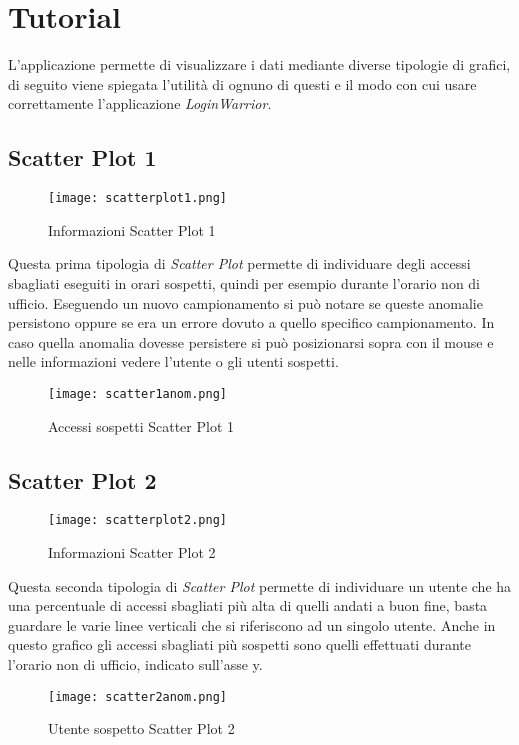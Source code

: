 \chapter{Tutorial}
L'applicazione permette di visualizzare i dati mediante diverse tipologie di grafici, di seguito viene spiegata l'utilità di ognuno di questi e il modo con cui usare correttamente l'applicazione \textit{LoginWarrior}.

\section{Scatter Plot 1}
\begin{figure}[H]
	\centering
	\texttt{[image: scatterplot1.png]}
	\caption{Informazioni Scatter Plot 1}
  \end{figure}
Questa prima tipologia di \textit{Scatter Plot} permette di individuare degli accessi sbagliati eseguiti in orari sospetti, quindi per esempio durante l'orario non di ufficio. Eseguendo un nuovo campionamento si può notare se queste anomalie persistono oppure se era un errore dovuto a quello specifico campionamento. In caso quella anomalia dovesse persistere si può posizionarsi sopra con il mouse e nelle informazioni vedere l'utente o gli utenti sospetti.
\begin{figure}[H]
	\centering
	\texttt{[image: scatter1anom.png]}
	\caption{Accessi sospetti Scatter Plot 1}
\end{figure}

\section{Scatter Plot 2}
\begin{figure}[H]
	\centering
	\texttt{[image: scatterplot2.png]}
	\caption{Informazioni Scatter Plot 2}
  \end{figure}
Questa seconda tipologia di \textit{Scatter Plot} permette di individuare un utente che ha una percentuale di accessi sbagliati più alta di quelli andati a buon fine, basta guardare le varie linee verticali che si riferiscono ad un singolo utente. Anche in questo grafico gli accessi sbagliati più sospetti sono quelli effettuati durante l'orario non di ufficio, indicato sull'asse y.
\begin{figure}[H]
	\centering
	\texttt{[image: scatter2anom.png]}
	\caption{Utente sospetto Scatter Plot 2}
\end{figure}

